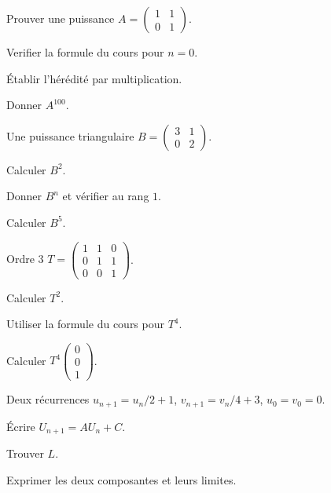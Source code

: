 \begingroup\renewcommand{\otBesoinPlace}[1]{}\begin{minipage}{\linewidth}
\begin{exercice}[2]{Prouver une puissance}
$A=\begin{pmatrix}1&1\\0&1\end{pmatrix}$.
\begin{questions}
\item Verifier la formule du cours pour $n=0$.
\item Établir l’hérédité par multiplication.
\item Donner $A^{100}$.
\end{questions}
\end{exercice}
\begin{exercice}[2]{Une puissance triangulaire}
$B=\begin{pmatrix}3&1\\0&2\end{pmatrix}$.
\begin{questions}
\item Calculer $B^2$.
\item Donner $B^n$ et vérifier au rang $1$.
\item Calculer $B^5$.
\end{questions}
\end{exercice}
\begin{exercice}[2]{Ordre $3$}
$T=\begin{pmatrix}1&1&0\\0&1&1\\0&0&1\end{pmatrix}$.
\begin{questions}
\item Calculer $T^2$.
\item Utiliser la formule du cours pour $T^4$.
\item Calculer $T^4\begin{pmatrix}0\\0\\1\end{pmatrix}$.
\end{questions}
\end{exercice}
\begin{exercice}[2]{Deux récurrences}
$u_{n+1}=u_n/2+1$, $v_{n+1}=v_n/4+3$, $u_0=v_0=0$.
\begin{questions}
\item Écrire $U_{n+1}=AU_n+C$.
\item Trouver $L$.
\item Exprimer les deux composantes et leurs limites.
\end{questions}
\end{exercice}
\end{minipage}\endgroup
